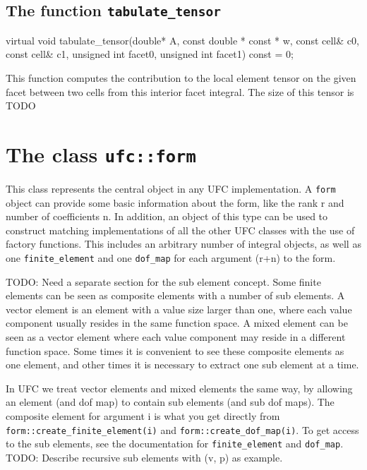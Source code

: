 \subsection{The function \texttt{tabulate\_tensor}}

\begin{code}
virtual void tabulate_tensor(double* A,
                             const double * const * w,
                             const cell& c0,
                             const cell& c1,
                             unsigned int facet0,
                             unsigned int facet1) const = 0;
\end{code}

This function computes the contribution to the local element tensor
on the given facet between two cells from this interior facet integral.
The size of this tensor is TODO

\section{The class \texttt{ufc::form}}

This class represents the central object in any UFC implementation.
A \texttt{form} object can provide some basic information about the form,
like the rank r and number of coefficients n.
In addition, an object of this type can be used to construct matching
implementations of all the other UFC classes with the use of factory functions.
This includes an arbitrary number of integral objects,
as well as one \texttt{finite\_element} and one \texttt{dof\_map} for
each argument (r+n) to the form.

TODO: Need a separate section for the sub element concept.
Some finite elements can be seen as composite elements with a number of sub elements.
A vector element is an element with a value size larger than one,
where each value component usually resides in the same function space.
A mixed element can be seen as a vector element where each value
component may reside in a different function space.
Some times it is convenient to see these composite elements as one element,
and other times it is necessary to extract one sub element at a time.

In UFC we treat vector elements and mixed elements the same way, by allowing
an element (and dof map) to contain sub elements (and sub dof maps).
The composite element for argument i is what you get directly from
\texttt{form::create\_finite\_element(i)} and \texttt{form::create\_dof\_map(i)}.
To get access to the sub elements, see the documentation for
\texttt{finite\_element} and \texttt{dof\_map}.
TODO: Describe recursive sub elements with (v, p) as example.

